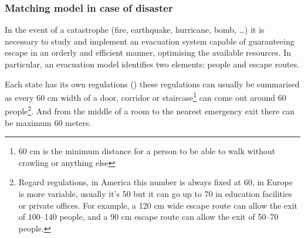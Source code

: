 \subsubsection{Matching model in case of disaster}\label{matching-model-in-case-of-disaster}%

In the event of a catastrophe (fire, earthquake, hurricane, bomb, \ldots) it is necessary to study and implement an evacuation system capable of guaranteeing escape in an orderly and efficient manner, optimising the available resources. In particular, an evacuation model identifies two elements: people and escape routes.

Each state has its own regulations (\citet{it-81-2008,uk-1541-2005,usa-1910-1974,cee-654-1989,cee-567-1977}) these regulations can usually be summarised as every 60 cm width of a door, corridor or staircase\footnote{60 cm is the minimum distance for a person to be able to walk without crawling or anything else} can come out around 60 people\footnote{Regard regulations, in America this number is always fixed at 60, in Europe is more variable, usually it's 50 but it can go up to 70 in education facilities or private offices. For example, a 120 cm wide escape route can allow the exit of 100--140 people, and a 90 cm escape route can allow the exit of 50--70 people.}.
And from the middle of a room to the nearest emergency exit there can be maximum 60 meters.

